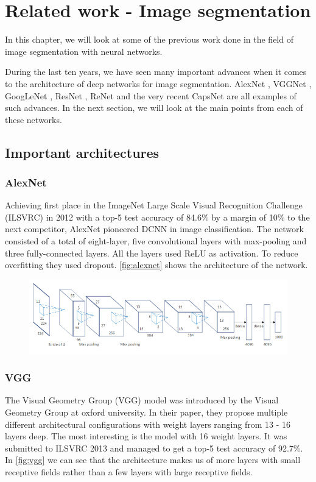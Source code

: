 \chapter{Related work - Image segmentation}\label{sec:previous-work-segmentation}
In this chapter, we will look at some of the previous work done in the field of image segmentation with neural networks. 

During the last ten years, we have seen many important advances when it comes to the architecture of deep networks for image segmentation. AlexNet \cite{Krizhevsky2012}, VGGNet \cite{Simonyan2014a}, GoogLeNet \cite{Szegedy2014}, ResNet \cite{He2015}, ReNet \cite{Visin2015} and the very recent CapsNet \cite{Sabour2017} are all examples of such advances. In the next section, we will look at the main points from each of these networks.

\section{Important architectures}\label{sec:important-architectures}

\subsection{AlexNet}
Achieving first place in the ImageNet Large Scale Visual Recognition Challenge (ILSVRC) \cite{Russakovsky2015}  in 2012 with a top-5 test accuracy of 84.6\% by a margin of 10\% to the next competitor, AlexNet pioneered DCNN in image classification. The network consisted of a total of eight-layer, five convolutional layers with max-pooling and three fully-connected layers. All the layers used ReLU as activation. To reduce overfitting they used dropout. \autoref{fig:alexnet} shows the architecture of the network.

\begin{figure}[H]
	\centering
	\includegraphics[width=0.7\linewidth]{fig/alexnet.png}
	\label{fig:alexnet}
\end{figure}


\subsection{VGG}
The Visual Geometry Group (VGG) model was introduced by the Visual Geometry Group at oxford university. In their paper, they propose multiple different architectural configurations with weight layers ranging from 13 - 16 layers deep. The most interesting is the model with 16 weight layers. It was submitted to ILSVRC 2013 and managed to get a top-5 test accuracy of 92.7\%. In \autoref{fig:vgg} we can see that the architecture makes us of more layers with small receptive fields rather than a few layers with large receptive fields.

